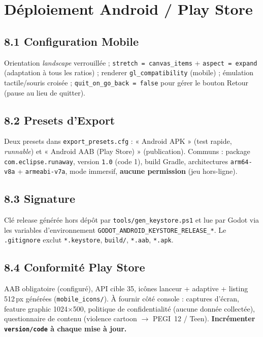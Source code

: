 \documentclass[11pt,a4paper]{article}
\newcommand{\code}[1]{\colorbox{codebg}{\texttt{#1}}}
\begin{document}
\section{D\'eploiement Android / Play Store}

\subsection{8.1 Configuration Mobile}
Orientation \emph{landscape} verrouill\'ee ; \code{stretch = canvas\_items} +
\code{aspect = expand} (adaptation \`a tous les ratios) ; renderer
\code{gl\_compatibility} (mobile) ; \'emulation tactile/souris crois\'ee ;
\code{quit\_on\_go\_back = false} pour g\'erer le bouton Retour (pause au lieu de
quitter).

\subsection{8.2 Presets d'Export}
Deux presets dans \code{export\_presets.cfg} : « Android APK » (test rapide,
\emph{runnable}) et « Android AAB (Play Store) » (publication). Communs :
package \code{com.eclipse.runaway}, version \code{1.0} (code 1), build Gradle,
architectures \code{arm64-v8a} + \code{armeabi-v7a}, mode immersif, \textbf{aucune
permission} (jeu hors-ligne).

\subsection{8.3 Signature}
Cl\'e release g\'en\'er\'ee hors d\'ep\^ot par \code{tools/gen\_keystore.ps1} et lue par
Godot via les variables d'environnement
\code{GODOT\_ANDROID\_KEYSTORE\_RELEASE\_*}. Le \code{.gitignore} exclut
\code{*.keystore}, \code{build/}, \code{*.aab}, \code{*.apk}.

\subsection{8.4 Conformit\'e Play Store}
AAB obligatoire (configur\'e), API cible 35, ic\^ones lanceur + adaptive + listing
512\,px g\'en\'er\'ees (\code{mobile\_icons/}). \`A fournir c\^ot\'e console : captures
d'\'ecran, feature graphic 1024$\times$500, politique de confidentialit\'e (aucune
donn\'ee collect\'ee), questionnaire de contenu (violence cartoon $\to$ PEGI~12 /
Teen). \textbf{Incr\'ementer \code{version/code} \`a chaque mise \`a jour.}
\end{document}
